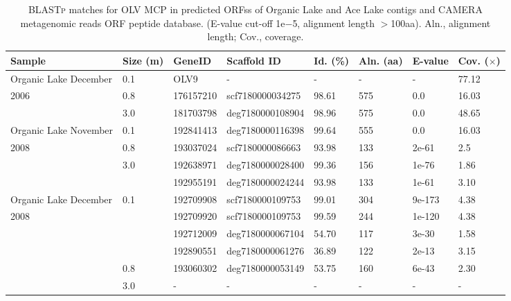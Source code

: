 \begingroup
\begin{table}
\footnotesize
\caption[]{ \textsc{BLASTp} matches for \ac{OLV} \ac{MCP} in predicted \acp{ORFs} of Organic Lake and Ace Lake contigs and \ac{CAMERA} metagenomic reads \ac{ORF} peptide database. (E-value cut-off 1e$-$5, alignment length $>$100aa). Aln., alignment length; Cov., coverage.}
\label{tab:olv_mcp_blastp}
\smallskip
\begin{tabularx}{\textwidth}{p{3.5cm}p{0.5cm}p{1.5cm}Xp{0.5cm}p{0.5cm}p{1cm}p{0.8cm}}
\toprule
\textbf{Sample} & \textbf{Size (\textmu{}m)} & \textbf{GeneID} & \textbf{Scaffold ID} & \textbf{Id. (\%)} & \textbf{Aln. (aa)} & \textbf{E-value} & \textbf{Cov. ($\times$)} \\
\midrule
Organic Lake December  & 0.1 & OLV9 & - & - & - & - & 77.12 \\
2006 & 0.8 & 176157210 & scf7180000034275 & 98.61 & 575 & 0.0 & 16.03 \\
 & 3.0 & 181703798 & deg7180000108904 & 98.96 & 575 & 0.0 & 48.65 \\

Organic Lake November  & 0.1 & 192841413 & deg7180000116398 & 99.64 & 555 & 0.0 & 16.03 \\
2008 & 0.8 & 193037024 & scf7180000086663 & 93.98 & 133 & 2e-61 & 2.5 \\
 & 3.0 & 192638971 & deg7180000028400 & 99.36 & 156 & 1e-76 & 1.86 \\
 &  & 192955191 & deg7180000024244 & 93.98 & 133 & 1e-61 & 3.10 \\

Organic Lake December  & 0.1 & 192709908 & scf7180000109753 & 99.01 & 304 & 9e-173 & 4.38 \\
2008 &  & 192709920 & scf7180000109753 & 99.59 & 244 & 1e-120 & 4.38 \\
 &  & 192712009 & deg7180000067104 & 54.70 & 117 & 3e-30 & 1.58 \\
 &  & 192890551 & deg7180000061276 & 36.89 & 122 & 2e-13 & 3.15 \\
 & 0.8 & 193060302 & deg7180000053149 & 53.75 & 160 & 6e-43 & 2.30 \\
 & 3.0 & - & - & - & - & - & - \\

\bottomrule
\end{tabularx}
\end{table}
\endgroup

